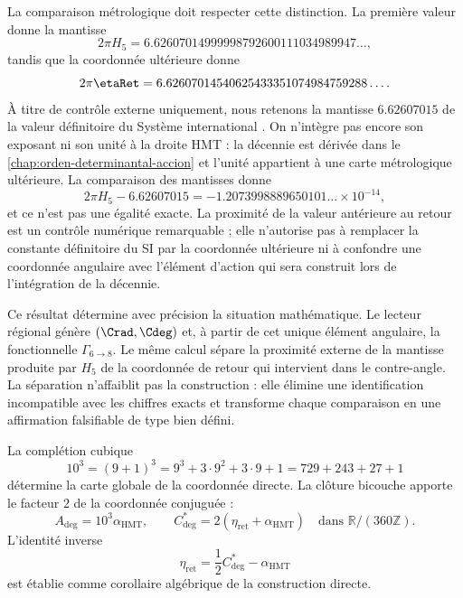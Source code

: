 La comparaison métrologique doit respecter cette distinction. La première valeur donne
la mantisse
\[
2\pi H_5
=6.62607014999998792600111034989947\ldots,
\]
tandis que la coordonnée ultérieure donne
\[
2\pi\etaRet
=6.62607014540625433351074984759288\ldots.
\]
À titre de contrôle externe uniquement, nous retenons la mantisse \(6.62607015\) de la
valeur définitoire du Système international \cite{BIPMSI}. On n'intègre
pas encore son exposant ni son unité à la droite HMT : la décennie est dérivée dans le
\cref{chap:orden-determinantal-accion} et l'unité appartient à une carte
métrologique ultérieure. La comparaison des mantisses donne
\[
2\pi H_5-6.62607015
=-1.2073998889650101\ldots\times10^{-14},
\]
et ce n'est pas une égalité exacte. La proximité de la valeur antérieure au retour est
un contrôle numérique remarquable ; elle n'autorise pas à remplacer la constante définitoire
du SI par la coordonnée ultérieure ni à confondre une coordonnée angulaire avec
l'élément d'action qui sera construit lors de l'intégration de la décennie.

Ce résultat détermine avec précision la situation mathématique. Le lecteur
régional génère \((\Crad,\Cdeg)\) et, à partir de cet unique élément angulaire, la fonctionnelle
\(\Gamma_{6\to8}\). Le même calcul sépare la proximité externe de la
mantisse produite par \(H_5\) de la coordonnée de retour qui intervient dans le
contre-angle. La séparation n'affaiblit pas la construction : elle élimine une
identification incompatible avec les chiffres exacts et transforme chaque
comparaison en une affirmation falsifiable de type bien défini.

\label{sec:l9s102:par-angular}

La complétion cubique
\begin{equation}
 10^3=(9+1)^3=9^3+3\cdot9^2+3\cdot9+1
 =729+243+27+1
 \label{eq:l9s102:base-1000}
\end{equation}
détermine la carte globale de la coordonnée directe. La clôture bicouche apporte
le facteur \(2\) de la coordonnée conjuguée :
\begin{equation}
 \boxed{
 A_{\deg}=10^3\alpha_{\mathrm{HMT}},
 \qquad
 C^*_{\deg}=2(\eta_{\mathrm{ret}}+\alpha_{\mathrm{HMT}})
 \quad\text{dans }\mathbb R/(360\mathbb Z).}
 \label{eq:l9s102:a-cstar-deg}
\end{equation}
L'identité inverse
\begin{equation}
 \eta_{\mathrm{ret}}=\frac12C^*_{\deg}-\alpha_{\mathrm{HMT}}
 \label{eq:l9s102:eta-corolario-inverso}
\end{equation}
est établie comme corollaire algébrique de la construction directe.

